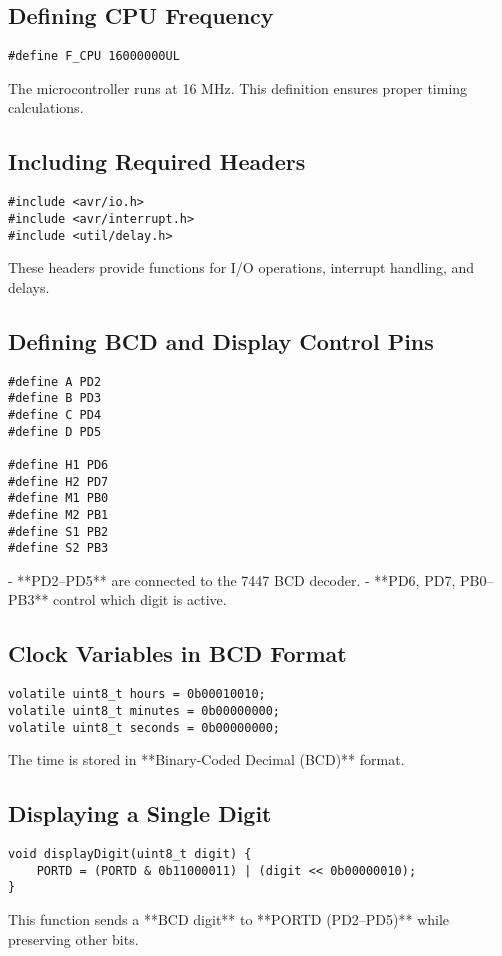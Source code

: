 
\subsection*{Defining CPU Frequency}
\begin{lstlisting}
#define F_CPU 16000000UL
\end{lstlisting}
The microcontroller runs at 16 MHz. This definition ensures proper timing calculations.

\subsection*{Including Required Headers}
\begin{lstlisting}
#include <avr/io.h>
#include <avr/interrupt.h>
#include <util/delay.h>
\end{lstlisting}
These headers provide functions for I/O operations, interrupt handling, and delays.

\subsection*{Defining BCD and Display Control Pins}
\begin{lstlisting}
#define A PD2  
#define B PD3  
#define C PD4  
#define D PD5  

#define H1 PD6  
#define H2 PD7  
#define M1 PB0  
#define M2 PB1  
#define S1 PB2  
#define S2 PB3  
\end{lstlisting}
- **PD2–PD5** are connected to the 7447 BCD decoder.
- **PD6, PD7, PB0–PB3** control which digit is active.

\subsection*{Clock Variables in BCD Format}
\begin{lstlisting}
volatile uint8_t hours = 0b00010010;
volatile uint8_t minutes = 0b00000000;
volatile uint8_t seconds = 0b00000000;
\end{lstlisting}
The time is stored in **Binary-Coded Decimal (BCD)** format.

\subsection*{Displaying a Single Digit}
\begin{lstlisting}
void displayDigit(uint8_t digit) {
    PORTD = (PORTD & 0b11000011) | (digit << 0b00000010);
}
\end{lstlisting}
This function sends a **BCD digit** to **PORTD (PD2–PD5)** while preserving other bits.

